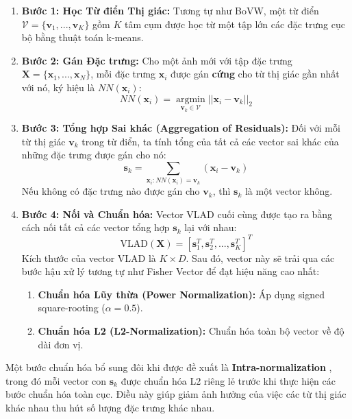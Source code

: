\begin{enumerate}
    \item \textbf{Bước 1: Học Từ điển Thị giác:} Tương tự như BoVW, một từ điển $\mathcal{V} = \{\mathbf{v}_1, ..., \mathbf{v}_K\}$ gồm $K$ tâm cụm được học từ một tập lớn các đặc trưng cục bộ bằng thuật toán k-means.

    \item \textbf{Bước 2: Gán Đặc trưng:} Cho một ảnh mới với tập đặc trưng $\mathbf{X} = \{\mathbf{x}_1, ..., \mathbf{x}_N\}$, mỗi đặc trưng $\mathbf{x}_i$ được gán \textbf{cứng} cho từ thị giác gần nhất với nó, ký hiệu là $NN(\mathbf{x}_i)$:
    \begin{equation}
        NN(\mathbf{x}_i) = \underset{\mathbf{v}_k \in \mathcal{V}}{\operatorname{argmin}} ||\mathbf{x}_i - \mathbf{v}_k||_2
    \end{equation}

    \item \textbf{Bước 3: Tổng hợp Sai khác (Aggregation of Residuals):} Đối với mỗi từ thị giác $\mathbf{v}_k$ trong từ điển, ta tính tổng của tất cả các vector sai khác của những đặc trưng được gán cho nó:
    \begin{equation}
        \mathbf{s}_k = \sum_{\mathbf{x}_i : NN(\mathbf{x}_i) = \mathbf{v}_k} (\mathbf{x}_i - \mathbf{v}_k)
        \label{eq:vlad_aggregation}
    \end{equation}
    Nếu không có đặc trưng nào được gán cho $\mathbf{v}_k$, thì $\mathbf{s}_k$ là một vector không.

    \item \textbf{Bước 4: Nối và Chuẩn hóa:} Vector VLAD cuối cùng được tạo ra bằng cách nối tất cả các vector tổng hợp $\mathbf{s}_k$ lại với nhau:
    \begin{equation}
        \text{VLAD}(\mathbf{X}) = \left[ \mathbf{s}_1^T, \mathbf{s}_2^T, ..., \mathbf{s}_K^T \right]^T
    \end{equation}
    Kích thước của vector VLAD là $K \times D$. Sau đó, vector này sẽ trải qua các bước hậu xử lý tương tự như Fisher Vector để đạt hiệu năng cao nhất:
    \begin{enumerate}
        \item \textbf{Chuẩn hóa Lũy thừa (Power Normalization):} Áp dụng signed square-rooting ($\alpha=0.5$).
        \item \textbf{Chuẩn hóa L2 (L2-Normalization):} Chuẩn hóa toàn bộ vector về độ dài đơn vị.
    \end{enumerate}
\end{enumerate}
Một bước chuẩn hóa bổ sung đôi khi được đề xuất là \textbf{Intra-normalization} \cite{Arandjelovic2013}, trong đó mỗi vector con $\mathbf{s}_k$ được chuẩn hóa L2 riêng lẻ trước khi thực hiện các bước chuẩn hóa toàn cục. Điều này giúp giảm ảnh hưởng của việc các từ thị giác khác nhau thu hút số lượng đặc trưng khác nhau.

